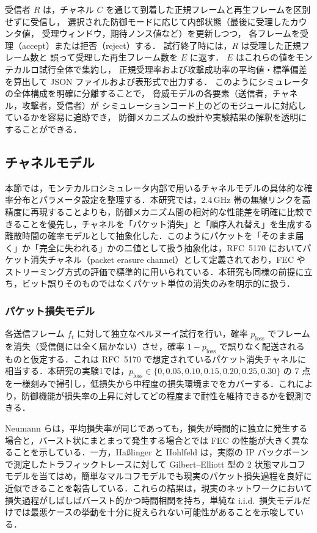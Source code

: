 \documentclass[twocolumn,10pt,a4paper]{jsarticle}
\begin{document}
受信者 $R$ は，チャネル $C$ を通じて到着した正規フレームと再生フレームを区別せずに受信し，
選択された防御モードに応じて内部状態（最後に受理したカウンタ値，
受理ウィンドウ，期待ノンス値など）を更新しつつ，
各フレームを受理（accept）または拒否（reject）する．
試行終了時には，$R$ は受理した正規フレーム数と
誤って受理した再生フレーム数を $E$ に返す．
$E$ はこれらの値をモンテカルロ試行全体で集約し，
正規受理率および攻撃成功率の平均値・標準偏差を算出して
JSON ファイルおよび表形式で出力する．
このようにシミュレータの全体構成を明確に分離することで，
脅威モデルの各要素（送信者，チャネル，攻撃者，受信者）が
シミュレーションコード上のどのモジュールに対応しているかを容易に追跡でき，
防御メカニズムの設計や実験結果の解釈を透明にすることができる．

\subsection{チャネルモデル}

本節では，モンテカルロシミュレータ内部で用いるチャネルモデルの具体的な確率分布とパラメータ設定を整理する．本研究では，2.4\,GHz 帯の無線リンクを高精度に再現することよりも，防御メカニズム間の相対的な性能差を明確に比較できることを優先し，チャネルを「パケット消失」と「順序入れ替え」を生成する離散時間の確率モデルとして抽象化した．このようにパケットを「そのまま届く」か「完全に失われる」かの二値として扱う抽象化は，RFC~5170 においてパケット消失チャネル（packet erasure channel）として定義されており\cite{RFC5170}，FEC やストリーミング方式の評価で標準的に用いられている\cite{Neumann2005FEC}．本研究も同様の前提に立ち，ビット誤りそのものではなくパケット単位の消失のみを明示的に扱う．

\subsubsection{パケット損失モデル}

各送信フレーム $f_t$ に対して独立なベルヌーイ試行を行い，確率 $p_{\mathrm{loss}}$ でフレームを消失（受信側には全く届かない）させ，確率 $1-p_{\mathrm{loss}}$ で誤りなく配送されるものと仮定する．これは RFC~5170 で想定されているパケット消失チャネルに相当する\cite{RFC5170}．本研究の実験1では，$p_{\mathrm{loss}} \in \{0, 0.05, 0.10, 0.15, 0.20, 0.25, 0.30\}$ の 7 点を一様刻みで掃引し，低損失から中程度の損失環境までをカバーする．これにより，防御機能が損失率の上昇に対してどの程度まで耐性を維持できるかを観測できる．

Neumann らは，平均損失率が同じであっても，損失が時間的に独立に発生する場合と，バースト状にまとまって発生する場合とでは FEC の性能が大きく異なることを示している\cite{Neumann2005FEC}．一方，Ha{\ss}linger と Hohlfeld は，実際の IP バックボーンで測定したトラフィックトレースに対して Gilbert--Elliott 型の 2 状態マルコフモデルを当てはめ，簡単なマルコフモデルでも現実のパケット損失過程を良好に近似できることを報告している\cite{Hasslinger2008GE}．これらの結果は，現実のネットワークにおいて損失過程がしばしばバースト的かつ時間相関を持ち，単純な i.i.d.\ 損失モデルだけでは最悪ケースの挙動を十分に捉えられない可能性があることを示唆している．
\end{document}
